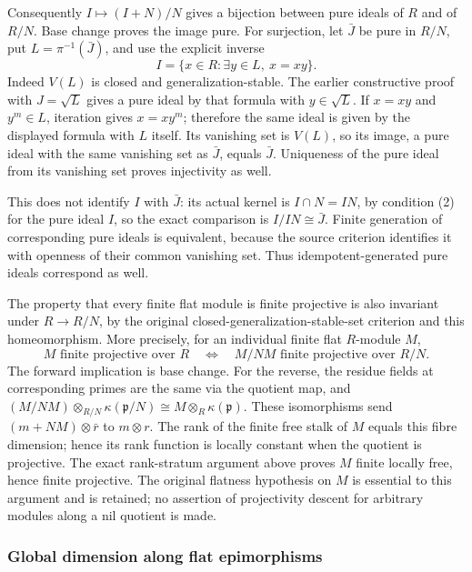 Consequently \(I\mapsto(I+N)/N\) gives a bijection between pure ideals of \(R\) and of \(R/N\). Base change proves the image pure. For surjection, let \(\bar J\) be pure in \(R/N\), put \(L=\pi^{-1}(\bar J)\), and use the explicit inverse \[
I=\{x\in R:\exists y\in L,\ x=xy\}.
\] Indeed \(V(L)\) is closed and generalization-stable. The earlier constructive proof with \(J=\sqrt L\) gives a pure ideal by that formula with \(y\in\sqrt L\). If \(x=xy\) and \(y^m\in L\), iteration gives \(x=xy^m\); therefore the same ideal is given by the displayed formula with \(L\) itself. Its vanishing set is \(V(L)\), so its image, a pure ideal with the same vanishing set as \(\bar J\), equals \(\bar J\). Uniqueness of the pure ideal from its vanishing set proves injectivity as well.

This does not identify \(I\) with \(\bar J\): its actual kernel is \(I\cap N=IN\), by condition (2) for the pure ideal \(I\), so the exact comparison is \(I/IN\cong\bar J\). Finite generation of corresponding pure ideals is equivalent, because the source criterion identifies it with openness of their common vanishing set. Thus idempotent-generated pure ideals correspond as well.

The property that every finite flat module is finite projective is also invariant under \(R\to R/N\), by the original closed-generalization-stable-set criterion and this homeomorphism. More precisely, for an individual finite flat \(R\)-module \(M\), \[
M\text{ finite projective over }R
\quad\Longleftrightarrow\quad
M/NM\text{ finite projective over }R/N .
\] The forward implication is base change. For the reverse, the residue fields at corresponding primes are the same via the quotient map, and \((M/NM)\otimes_{R/N}\kappa(\mathfrak p/N)
\cong M\otimes_R\kappa(\mathfrak p)\). These isomorphisms send \((m+NM)\otimes\bar r\) to \(m\otimes r\). The rank of the finite free stalk of \(M\) equals this fibre dimension; hence its rank function is locally constant when the quotient is projective. The exact rank-stratum argument above proves \(M\) finite locally free, hence finite projective. The original flatness hypothesis on \(M\) is essential to this argument and is retained; no assertion of projectivity descent for arbitrary modules along a nil quotient is made.

\subsubsection{Global dimension along flat epimorphisms}\label{algebra-proof-022-global-dimension-along-flat-epimorphisms}

